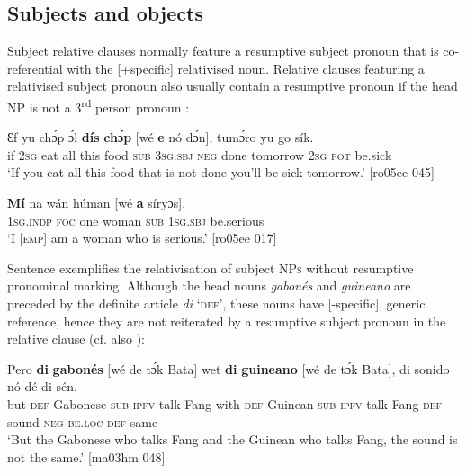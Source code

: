 \subsection{Subjects and objects} \label{sec:10.6.2}

Subject relative clauses normally feature a resumptive subject pronoun that is co-referential with the [+specific] relativised noun. Relative clauses featuring a relativised subject pronoun also usually contain a resumptive pronoun if the head \textsc{NP} is not a 3\textsuperscript{rd} person pronoun :


\ea%
    \label{ex:key:1430}
    \gll Ɛf  yu  chɔ́p  ɔ́l  \textbf{dís}  \textbf{chɔ́p}  [wé  \textbf{e}    nó  dɔ́n],  tumɔ́ro
yu  go  sík.\\
if  \textsc{2sg}  eat    all  this  food    \textsc{sub}  \textsc{3sg.sbj}  \textsc{neg}  done  tomorrow
\textsc{2sg}  \textsc{pot}  be.sick\\

\glt ‘If you eat all this food that is not done you’ll be sick tomorrow.’ [ro05ee 045]
\z


\ea%
    \label{ex:key:1431}
\gll
\textbf{Mí}    na  wán    húman  [wé  \textbf{a}   síryɔs].\\
\textsc{1sg.indp}  \textsc{foc}  one    woman   \textsc{sub}  \textsc{1sg.sbj}  be.serious\\
\glt ‘I \textsc{[emp]} am a woman who is serious.’  [ro05ee 017]
\z

Sentence  exemplifies the relativisation of subject \textsc{NPs} without resumptive pronominal marking. Although the head nouns \textit{gabonés} and \textit{guineano} are preceded by the definite article \textit{di} ‘\textsc{def’}, these nouns have [-specific], generic reference, hence they are not reiterated by a resumptive subject pronoun in the relative clause (cf. also ): 


\ea%
    \label{ex:key:1432}
    \gll Pero    \textbf{di}  \textbf{gabonés}    [wé  de  tɔ́k  Bata]  wet    \textbf{di}  \textbf{guineano}  
[wé  de  tɔ́k   Bata],  di  sonido  nó  dé    di  sén.\\
but    \textsc{def}  Gabonese   \textsc{sub}  \textsc{ipfv}  talk  Fang  with    \textsc{def}  Guinean    
 \textsc{sub}  \textsc{ipfv}  talk Fang    \textsc{def}  sound  \textsc{neg}  \textsc{be.loc}  \textsc{def}  same\\

\glt ‘But the Gabonese who talks Fang and the Guinean who talks Fang, 
the sound is not the same.’ [ma03hm 048]
\z

